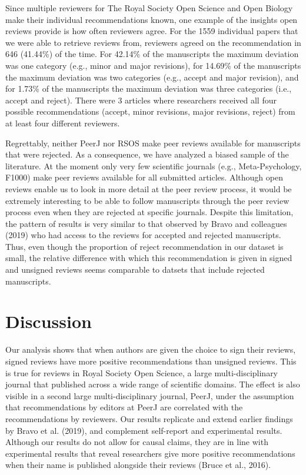 \documentclass[,jou, a4paper,floatsintext]{apa6}
\begin{document}
Since multiple reviewers for The Royal Society Open Science and Open Biology make their individual recommendations known, one example of the insights open reviews provide is how often reviewers agree. For the 1559 individual papers that we were able to retrieve reviews from, reviewers agreed on the recommendation in 646 (41.44\%) of the time. For 42.14\% of the manuscripts the maximum deviation was one category (e.g., minor and major revisions), for 14.69\% of the manuscripts the maximum deviation was two categories (e.g., accept and major revision), and for 1.73\% of the manuscripts the maximum deviation was three categories (i.e., accept and reject). There were 3 articles where researchers received all four possible recommendations (accept, minor revisions, major revisions, reject) from at least four different reviewers.

Regrettably, neither PeerJ nor RSOS make peer reviews available for manuscripts that were rejected. As a consequence, we have analyzed a biased sample of the literature. At the moment only very few scientific journals (e.g., Meta-Psychology, F1000) make peer reviews available for all submitted articles. Although open reviews enable us to look in more detail at the peer review process, it would be extremely interesting to be able to follow manuscripts through the peer review process even when they are rejected at specific journals. Despite this limitation, the pattern of results is very similar to that observed by Bravo and colleagues (2019) who had access to the reviews for accepted and rejected manuscripts. Thus, even though the proportion of reject recommendation in our dataset is small, the relative difference with which this recommendation is given in signed and unsigned reviews seems comparable to datsets that include rejected manuscripts.

\hypertarget{discussion}{%
\section{Discussion}\label{discussion}}

Our analysis shows that when authors are given the choice to sign their reviews, signed reviews have more positive recommendations than unsigned reviews. This is true for reviews in Royal Society Open Science, a large multi-disciplinary journal that published across a wide range of scientific domains. The effect is also visible in a second large multi-disciplinary journal, PeerJ, under the assumption that recommendations by editors at PeerJ are correlated with the recommendations by reviewers. Our results replicate and extend earlier findings by Bravo et al. (2019), and complement self-report and experimental results. Although our results do not allow for causal claims, they are in line with experimental results that reveal researchers give more positive recommendations when their name is published alongside their reviews (Bruce et al., 2016).
\end{document}
